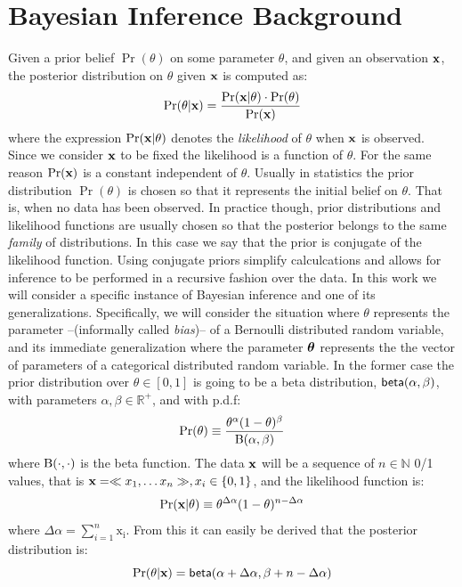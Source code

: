 \documentclass[sigconf, anonymous]{acmart}
\begin{document}
% 

\section{Bayesian Inference Background}
Given a prior belief $\Pr(\theta)$ on some parameter $\theta$,
and given an observation $\textbf{x}$,
the posterior distribution on $\theta$ given $\textbf{x}$ is computed as:
\[
  \Pr(\theta | \textbf{x}) = \frac{\Pr(\textbf{x} | \theta) \cdot \Pr(\theta)}{\Pr(\textbf{x})}
\]
where the expression  $\Pr(\textbf{x} | \theta)$ denotes the \emph{likelihood} of $\theta$ when
$\textbf{x}$ is observed. Since we consider $\textbf{x}$ to be fixed the likelihood is a function of $\theta$.
For the same reason $\Pr(\textbf{x})$ is a constant independent of $\theta$.
Usually in statistics the prior distribution $\Pr(\theta)$ is chosen so that it represents
the initial belief on $\theta$. That is, when no data has been observed. In practice though,
prior distributions and likelihood functions are usually chosen so that the posterior
belongs to the same \emph{family} of distributions. In this case we say that the prior
is conjugate of the likelihood function. Using conjugate priors simplify calculcations and allows
for inference to be performed in a recursive fashion over the data.
In this work we will consider a specific instance of Bayesian inference and one of its generalizations.
Specifically, we will consider the situation where $\theta$ represents the parameter --(informally called \emph{bias})--
of a Bernoulli distributed random variable, and its immediate generalization where the parameter $\boldsymbol{\theta}$ represents
the the vector of parameters of a categorical distributed random variable.
In the former case the prior distribution over $\theta\in [0,1]$ is going to be a beta distribution, $\mathsf{beta}(\alpha, \beta)$, with parameters
$\alpha,\beta\in\mathbb{R}^{+}$, and with p.d.f:
\[
  \Pr(\theta)\equiv \frac{\theta^{\alpha} (1- \theta)^{\beta}}{\textup{B}(\alpha,\beta)}
\]
where $\textup{B}(\cdot,\cdot)$ is the beta function.
The data $\textbf{x}$ will be a sequence of $n\in\mathbb{N}$ 0/1 values, that is $\textbf{x}=\ll x_1,\dots x_n \gg, x_i\in\{0,1\}$, and the likelihood function is:
\[
  \Pr(\textbf{x} | \theta)\equiv \theta^{\Delta \alpha}(1-\theta)^{n - \Delta \alpha}
\]
where $\Delta \alpha = \displaystyle\sum_{i=1}^{n}\mathrm{x_i}$.
From this it can easily be derived that the posterior distribution is:
\[
  \Pr(\theta|\textbf{x})=\mathsf{beta}(\alpha + \Delta \alpha,\beta + n - \Delta \alpha)
\]
\end{document}
